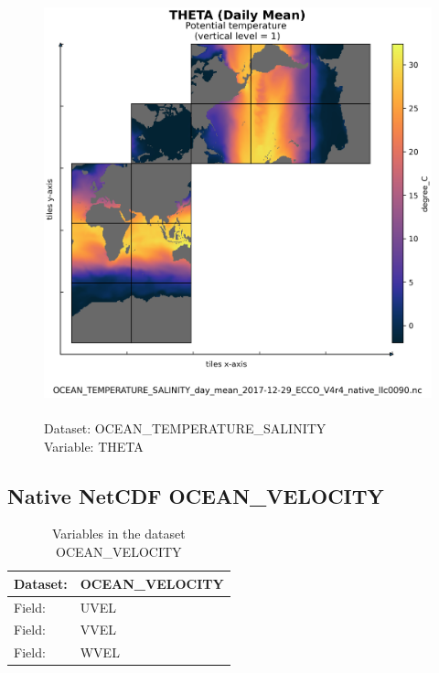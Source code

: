 \begin{figure}[H]
\centering
\includegraphics[scale=0.5]{../images/plots/native_plots/Ocean_Temperature_and_Salinity/THETA.png}
\caption{\\Dataset: OCEAN\_TEMPERATURE\_SALINITY\\Variable: THETA}
\label{tab:table-OCEAN_TEMPERATURE_SALINITY_THETA-Plot}
\end{figure}
\pagebreak
\subsection{Native NetCDF OCEAN\_VELOCITY}
\newp
\begin{longtable}{|p{}|p{}|}
\caption{Variables in the dataset OCEAN\_VELOCITY}
\label{tab:table-OCEAN_VELOCITY-fields} \\ 
\hline \endhead \hline \endfoot
\rowcolor{lightgray} \textbf{Dataset:} & \textbf{OCEAN\_VELOCITY} \\ \hline
Field: &UVEL \\ \hline
Field: &VVEL \\ \hline
Field: &WVEL \\ \hline
\end{longtable}

\pagebreak
